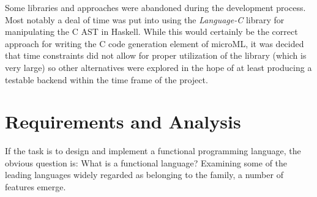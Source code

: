 \documentclass[12pt, a4paper]{report}
\begin{document}
Some libraries and approaches were abandoned during the development process. Most notably a deal of
time was put into using the \textit{Language-C} library for manipulating the C AST in Haskell. While
this would certainly be the correct approach for writing the C code generation element of microML,
it was decided that time constraints did not allow for proper utilization of the library (which is
very large) so other alternatives were explored in the hope of at least producing a testable backend
within the time frame of the project. 

\chapter{Requirements and Analysis}

If the task is to design and implement a functional programming language, the obvious question is: What is a functional language? 
Examining some of the leading languages widely regarded as belonging to the family, a number of
features emerge.

\begin{center}
\end{center}
\end{document}
